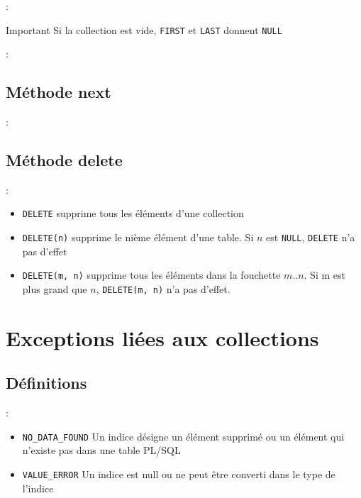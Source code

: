 \documentclass[10pt]{beamer}
\begin{document}
\begin{frame}{\secname : \subsecname}
    \begin{alertblock}{Important}
        Si la collection est vide, \lstinline[language=plsql]!FIRST! et \lstinline[language=plsql]!LAST! donnent \lstinline[language=plsql]!NULL!
    \end{alertblock}
\end{frame}

\begin{frame}{\secname : \subsecname}
    
\end{frame}

\subsection{Méthode next}
\begin{frame}{\secname : \subsecname}
    
\end{frame}

\subsection{Méthode delete}
\begin{frame}{\secname : \subsecname}
    \begin{itemize}
        \item \lstinline[language=plsql]!DELETE! supprime tous les éléments d'une collection
        \item \lstinline[language=plsql]!DELETE(n)! supprime le nième élément d'une table.  Si $n$ est \lstinline[language=plsql]!NULL!, \lstinline[language=plsql]!DELETE! n'a pas d'effet
        \item \lstinline[language=plsql]!DELETE(m, n)! supprime tous les éléments dans la fouchette $m..n$.  Si m est plus grand que $n$, \lstinline[language=plsql]!DELETE(m, n)! n'a pas d'effet.
    \end{itemize}
\end{frame}

\section{Exceptions liées aux collections}
\tocss
\subsection{Définitions}
\begin{frame}{\secname : \subsecname}
    \begin{itemize}
        \item \lstinline[language=plsql]!NO_DATA_FOUND! Un indice désigne un élément supprimé ou un élément qui n'existe pas dans une table PL/SQL
        \item \lstinline[language=plsql]!VALUE_ERROR! Un indice est null ou ne peut être converti dans le type de l'indice
    \end{itemize}
\end{frame}
\end{document}
